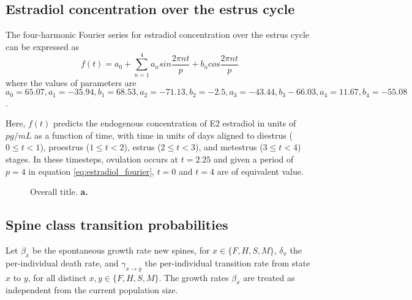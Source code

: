 \documentclass[11pt,letterpaper, onecolumn]{exam}
\begin{document}
\subsection{Estradiol concentration over the estrus cycle}\label{subsec2}
The four-harmonic Fourier series for estradiol concentration over the estrus cycle can be expressed as
\begin{equation}
f(t)=a_0+\sum_{n=1}^{4}a_n sin\frac{2\pi n t}{p}+b_n cos\frac{2\pi nt}{p}
\label{eq:estradiol_fourier}
\end{equation}
where the values of parameters are $a_0=65.07, a_1=-35.94, b_1=68.53, a_2=-71.13, b_2=-2.5, a_3=-43.44, b_3-66.03,  a_4=11.67, b_4=-55.08$.

Here, $f(t)$ predicts the endogenous concentration of E2 estradiol in units of $pg/mL$ as a function of time, with time in units of days aligned to diestrus ($0\leq t < 1$), proestrus ($1\leq t < 2$), estrus ($2\leq t < 3$), and metestrus ($3\leq t < 4$) stages. In these timesteps, ovulation occurs at $t=2.25$ and given a period of $p=4$ in equation \eqref{eq:estradiol_fourier}, $t=0$ and $t=4$ are of equivalent value.

\begin{figure}[h]
    \centering
    \caption{Overall title. \textbf{a.} }
    \label{fig:intro}
\end{figure}

\subsection{Spine class transition probabilities}

Let $\beta_x$ be the spontaneous growth rate new spines, for $x \in \{F, H, S, M\}$, $\delta_x$ the per-individual death rate, and $\gamma_{x \to y}$ the per-individual transition rate from state $x$ to $y$, for all distinct $x, y \in \{F, H, S, M\}$. The growth rates $\beta_x$ are treated as independent from the current population size.
\end{document}
